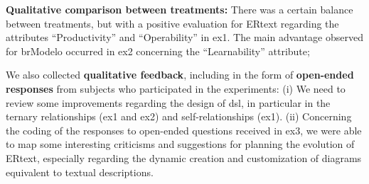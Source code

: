 \begin{description}
    \item \textbf{Qualitative comparison between treatments:} There was a certain balance between treatments, but with a positive evaluation for ERtext regarding the attributes ``Productivity'' and ``Operability'' in \ac{ex1}.
    The main advantage observed for brModelo occurred in \ac{ex2} concerning the ``Learnability'' attribute;
    
    \item We also collected \textbf{qualitative feedback}, including in the form of \textbf{open-ended responses} from subjects who participated in the experiments:
    (i) We need to review some improvements regarding the design of \ac{dsl}, in particular in the ternary relationships (\ac{ex1} and \ac{ex2}) and self-relationships (\ac{ex1}).
    (ii) Concerning the coding of the responses to open-ended questions received in \ac{ex3}, we were able to map some interesting criticisms and suggestions for planning the evolution of ERtext, especially regarding the dynamic creation and customization of diagrams equivalent to textual descriptions.
\end{description}

